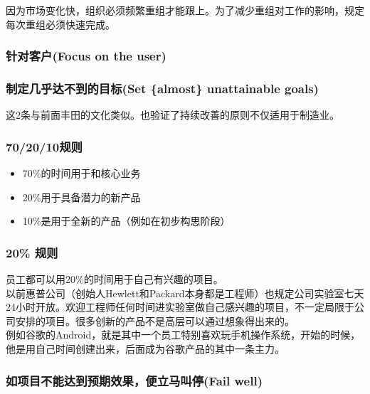因为市场变化快，组织必须频繁重组才能跟上。为了减少重组对工作的影响，规定每次重组必须快速完成。

\hypertarget{ux9488ux5bf9ux5ba2ux6237focus-on-the-user}{%
\subsubsection{针对客户(Focus on the
user)}\label{ux9488ux5bf9ux5ba2ux6237focus-on-the-user}}

\hypertarget{ux5236ux5b9aux51e0ux4e4eux8fbeux4e0dux5230ux7684ux76eeux6807set-almost-unattainable-goals}{%
\subsubsection{制定几乎达不到的目标(Set \{almost\} unattainable
goals)}\label{ux5236ux5b9aux51e0ux4e4eux8fbeux4e0dux5230ux7684ux76eeux6807set-almost-unattainable-goals}}

这2条与前面丰田的文化类似。也验证了持续改善的原则不仅适用于制造业。

\hypertarget{ux89c4ux5219}{%
\subsubsection{70/20/10规则}\label{ux89c4ux5219}}

\begin{itemize}
\tightlist
\item
  70\%的时间用于和核心业务
\item
  20\%用于具备潜力的新产品
\item
  10\%是用于全新的产品（例如在初步构思阶段）
\end{itemize}

\hypertarget{ux89c4ux5219-1}{%
\subsubsection{20\% 规则}\label{ux89c4ux5219-1}}

员工都可以用20\%的时间用于自己有兴趣的项目。\\
以前惠普公司（创始人Hewlett和Packard本身都是工程师）也规定公司实验室七天24小时开放。欢迎工程师任何时间进实验室做自己感兴趣的项目，不一定局限于公司安排的项目。很多创新的产品不是高层可以通过想象得出来的。\\
例如谷歌的Android，就是其中一个员工特别喜欢玩手机操作系统，开始的时候，他是用自己时间创建出来，后面成为谷歌产品的其中一条主力。

\hypertarget{ux5982ux9879ux76eeux4e0dux80fdux8fbeux5230ux9884ux671fux6548ux679cux4fbfux7acbux9a6cux53ebux505cfail-well}{%
\subsubsection{如项目不能达到预期效果，便立马叫停(Fail
well)}\label{ux5982ux9879ux76eeux4e0dux80fdux8fbeux5230ux9884ux671fux6548ux679cux4fbfux7acbux9a6cux53ebux505cfail-well}}

